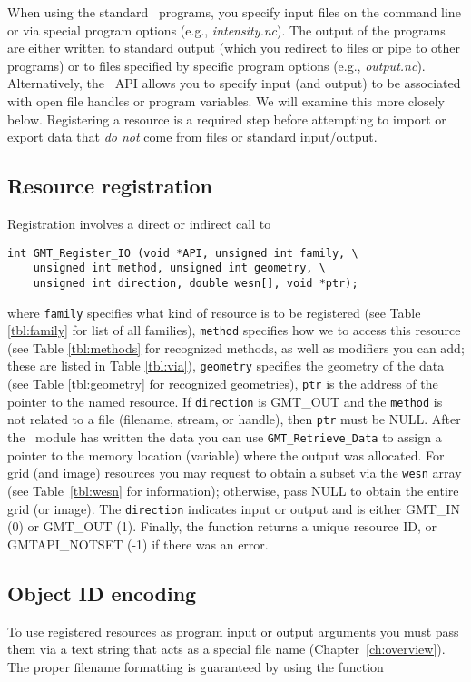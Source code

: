 \documentclass[11pt]{report}
\begin{document}
When using the standard \GMT\ programs, you specify input files on
the command line or via special program options (e.g., \emph{intensity.nc}). The output of
the programs are either written to standard output (which you redirect to files or pipe to other programs)
or to files specified by specific program options (e.g., \emph{output.nc}).  Alternatively, the
\GMT\ API allows you to specify input (and output) to be associated with open file handles
or program variables.  We will examine this more closely below.  Registering a
resource is a required step before attempting to import or export data that \emph{do not} come from files
or standard input/output.

\subsection{Resource registration}
Registration involves a direct or indirect call to

\begin{verbatim}
int GMT_Register_IO (void *API, unsigned int family, \
    unsigned int method, unsigned int geometry, \
    unsigned int direction, double wesn[], void *ptr);
\end{verbatim}
where \texttt{family} specifies what kind of resource is to be registered
(see Table \ref{tbl:family} for list of all families), \texttt{method} specifies
how we to access this resource (see Table \ref{tbl:methods} for recognized methods,
as well as modifiers you can add; these are listed in Table \ref{tbl:via}),
\texttt{geometry} specifies the geometry of the data (see Table \ref{tbl:geometry} for recognized geometries),
\texttt{ptr} is the address of the pointer to the named resource.  If \texttt{direction}
is GMT\_OUT and the \texttt{method} is not related to a file (filename, stream, or handle),
then \texttt{ptr} must be NULL.  After the \GMT\ module has written the data you can use
\texttt{GMT\_Retrieve\_Data} to assign a pointer to the memory location (variable) where the output was allocated.
For grid (and image) resources you may request to obtain a subset via the \texttt{wesn}
array (see Table~\ref{tbl:wesn} for information); otherwise, pass NULL to obtain the entire grid (or image).
The \texttt{direction} indicates input or output and is either GMT\_IN (0) or GMT\_OUT (1).
Finally, the function returns a unique resource ID, or GMTAPI\_NOTSET (-1) if there was an
error.

\subsection{Object ID encoding}
To use registered resources as program input or output arguments you must pass them via
a text string that acts as a special file name (Chapter~\ref{ch:overview}).  The proper filename
formatting is guaranteed by using the function
\index{GMT\_Encode\_ID}
\end{document}
